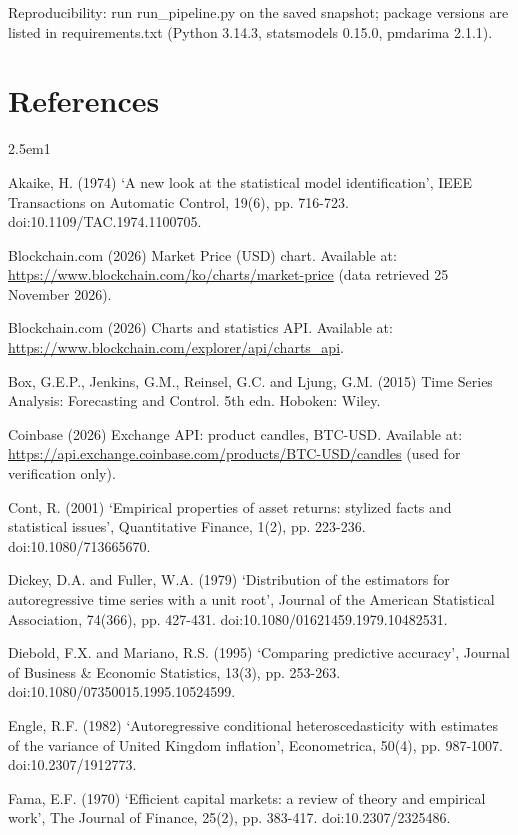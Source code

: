 \documentclass[11pt,a4paper]{article}
\begin{document}
Reproducibility: run run\_pipeline.py on the saved snapshot; package versions are listed in requirements.txt (Python 3.14.3, statsmodels 0.15.0, pmdarima 2.1.1).

\clearpage
\section*{References}

\begin{hangparas}{2.5em}{1}
\raggedright
Akaike, H. (1974) `A new look at the statistical model identification', IEEE Transactions on Automatic Control, 19(6), pp. 716-723. doi:10.1109/TAC.1974.1100705.

Blockchain.com (2026) Market Price (USD) chart. Available at: \url{https://www.blockchain.com/ko/charts/market-price} (data retrieved 25 November 2026).

Blockchain.com (2026) Charts and statistics API. Available at: \url{https://www.blockchain.com/explorer/api/charts_api}.

Box, G.E.P., Jenkins, G.M., Reinsel, G.C. and Ljung, G.M. (2015) Time Series Analysis: Forecasting and Control. 5th edn. Hoboken: Wiley.

Coinbase (2026) Exchange API: product candles, BTC-USD. Available at: \url{https://api.exchange.coinbase.com/products/BTC-USD/candles} (used for verification only).

Cont, R. (2001) `Empirical properties of asset returns: stylized facts and statistical issues', Quantitative Finance, 1(2), pp. 223-236. doi:10.1080/713665670.

Dickey, D.A. and Fuller, W.A. (1979) `Distribution of the estimators for autoregressive time series with a unit root', Journal of the American Statistical Association, 74(366), pp. 427-431. doi:10.1080/01621459.1979.10482531.

Diebold, F.X. and Mariano, R.S. (1995) `Comparing predictive accuracy', Journal of Business \& Economic Statistics, 13(3), pp. 253-263. doi:10.1080/07350015.1995.10524599.

Engle, R.F. (1982) `Autoregressive conditional heteroscedasticity with estimates of the variance of United Kingdom inflation', Econometrica, 50(4), pp. 987-1007. doi:10.2307/1912773.

Fama, E.F. (1970) `Efficient capital markets: a review of theory and empirical work', The Journal of Finance, 25(2), pp. 383-417. doi:10.2307/2325486.


\end{hangparas}
\end{document}
